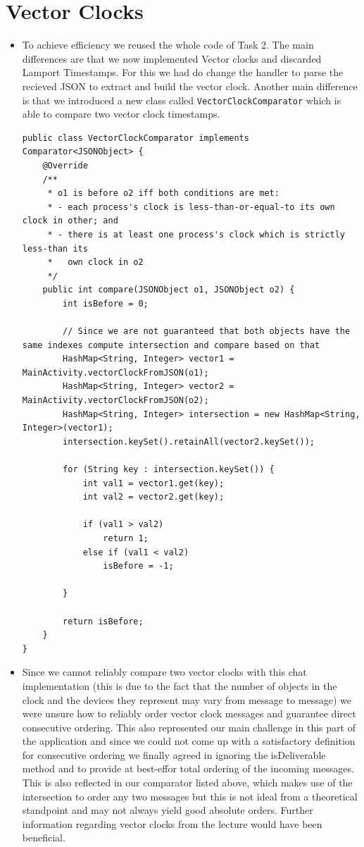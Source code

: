 \documentclass{report}
\begin{document}
\section{Vector Clocks}
\begin{itemize}
  \item To achieve efficiency we reused the whole code of Task 2. The main differences are that we now implemented Vector clocks and discarded Lamport Timestamps. For this we had do change the handler to parse the recieved JSON to extract and build the vector clock. Another main difference is that we introduced a new class called \texttt{VectorClockComparator} which is able to compare two vector clock timestamps.

\begin{lstlisting}
public class VectorClockComparator implements Comparator<JSONObject> {
	@Override
	/**
     * o1 is before o2 iff both conditions are met:
     * - each process's clock is less-than-or-equal-to its own clock in other; and
     * - there is at least one process's clock which is strictly less-than its
     *   own clock in o2
     */
    public int compare(JSONObject o1, JSONObject o2) {
		int isBefore = 0;
		
		// Since we are not guaranteed that both objects have the same indexes compute intersection and compare based on that
		HashMap<String, Integer> vector1 = MainActivity.vectorClockFromJSON(o1);
		HashMap<String, Integer> vector2 = MainActivity.vectorClockFromJSON(o2);
		HashMap<String, Integer> intersection = new HashMap<String, Integer>(vector1);
		intersection.keySet().retainAll(vector2.keySet());
		
		for (String key : intersection.keySet()) {
			int val1 = vector1.get(key);
			int val2 = vector2.get(key);
			
			if (val1 > val2)
				return 1;
			else if (val1 < val2)
				isBefore = -1;
			
		}
		
		return isBefore;
	}
}
\end{lstlisting}
  \item Since we cannot reliably compare two vector clocks with this chat implementation (this is due to the fact that the number of objects in the clock and the devices they represent may vary from message to message) we were unsure how to reliably order vector clock messages and guarantee direct consecutive ordering. This also represented our main challenge in this part of the application and since we could not come up with a satisfactory definition for consecutive ordering we finally agreed in ignoring the isDeliverable method and to provide at best-effor total ordering of the incoming messages. This is also reflected in our comparator listed above, which makes use of the intersection to order any two messages but this is not ideal from a theoretical standpoint and may not always yield good absolute orders. Further information regarding vector clocks from the lecture would have been beneficial.
\end{itemize}
\end{document}
